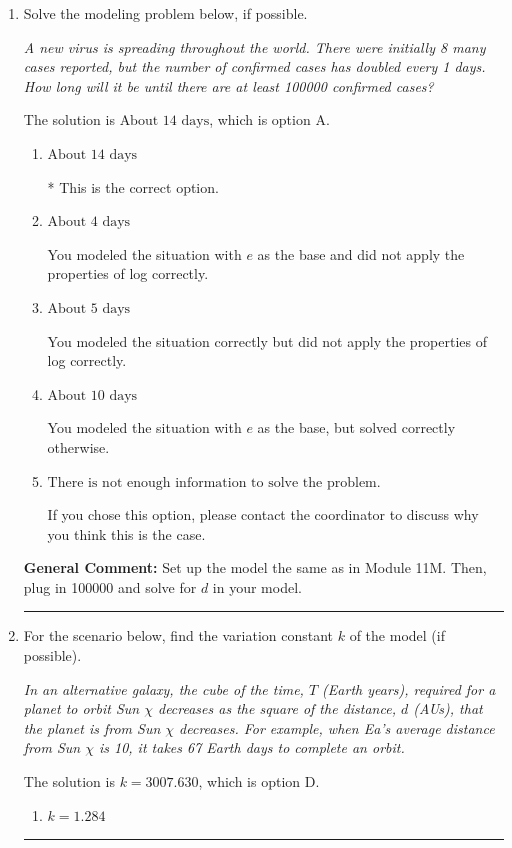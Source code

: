 \documentclass{extbook}[14pt]
\newcommand{\litem}[1]{\item #1

\rule{\textwidth}{0.4pt}}
\begin{document}
\begin{enumerate}\litem{
Solve the modeling problem below, if possible.

\begin{center}
    \textit{ A new virus is spreading throughout the world. There were initially 8 many cases reported, but the number of confirmed cases has doubled every 1 days. How long will it be until there are at least 100000 confirmed cases? }
\end{center}
The solution is \( \text{About } 14 \text{ days} \), which is option A.\begin{enumerate}[label=\Alph*.]
\item \( \text{About } 14 \text{ days} \)

* This is the correct option.
\item \( \text{About } 4 \text{ days} \)

You modeled the situation with $e$ as the base and did not apply the properties of log correctly.
\item \( \text{About } 5 \text{ days} \)

You modeled the situation correctly but did not apply the properties of log correctly.
\item \( \text{About } 10 \text{ days} \)

You modeled the situation with $e$ as the base, but solved correctly otherwise.
\item \( \text{There is not enough information to solve the problem.} \)

If you chose this option, please contact the coordinator to discuss why you think this is the case.
\end{enumerate}

\textbf{General Comment:} Set up the model the same as in Module 11M. Then, plug in 100000 and solve for $d$ in your model.
}
\litem{
For the scenario below, find the variation constant $k$ of the model (if possible).

\begin{center}
    \textit{ In an alternative galaxy, the cube of the time, $T$ (Earth years), required for a planet to orbit Sun $\chi$ decreases as the square of the distance, $d$ (AUs), that the planet is from Sun $\chi$ decreases. For example, when Ea's average distance from Sun $\chi$ is 10, it takes 67 Earth days to complete an orbit. }
\end{center}
The solution is \( k = 3007.630 \), which is option D.\begin{enumerate}[label=\Alph*.]
\item \( k = 1.284 \)


\end{enumerate}}
\end{enumerate}
\end{document}
